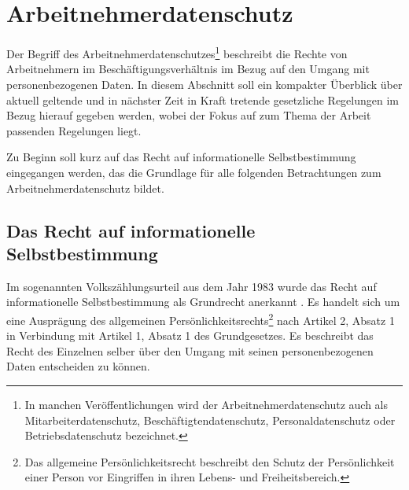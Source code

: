 \section{Arbeitnehmerdatenschutz}

\label{sec_basics_employee_privacy}


Der Begriff des Arbeitnehmerdatenschutzes\footnote{
  In manchen Veröffentlichungen wird der Arbeitnehmerdatenschutz auch als Mitarbeiterdatenschutz, Beschäftigtendatenschutz, Personaldatenschutz oder Betriebsdatenschutz bezeichnet.
}
beschreibt die Rechte von Arbeitnehmern im Beschäftigungsverhältnis im Bezug auf den Umgang mit personenbezogenen Daten. In diesem Abschnitt soll ein kompakter Überblick über aktuell geltende und in nächster Zeit in Kraft tretende gesetzliche Regelungen im Bezug hierauf gegeben werden, wobei der Fokus auf zum Thema der Arbeit passenden Regelungen liegt.

Zu Beginn soll kurz auf das Recht auf informationelle Selbstbestimmung eingegangen werden, das die Grundlage für alle folgenden Betrachtungen zum Arbeitnehmerdatenschutz bildet.

\subsection*{Das Recht auf informationelle Selbstbestimmung}

Im sogenannten Volkszählungsurteil aus dem Jahr 1983 wurde das Recht auf informationelle Selbstbestimmung als Grundrecht anerkannt \cite{TODO}. 
Es handelt sich um eine Ausprägung des allgemeinen Persönlichkeitsrechts\footnote{
  Das allgemeine Persönlichkeitsrecht beschreibt den Schutz der Persönlichkeit einer Person vor Eingriffen in ihren Lebens- und Freiheitsbereich.
} nach Artikel 2, Absatz 1 in Verbindung mit Artikel 1, Absatz 1 des Grundgesetzes. Es beschreibt das Recht des Einzelnen selber über den Umgang mit seinen personenbezogenen Daten entscheiden zu können. 

%    
%    
%        
    
